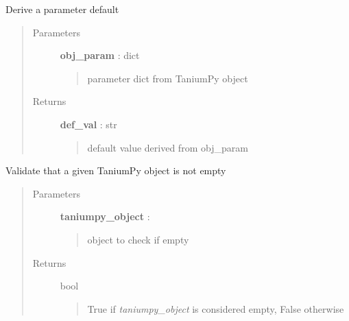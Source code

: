 \documentclass[letterpaper,10pt,english]{sphinxmanual}
\begin{document}
\begin{fulllineitems}
\label{pytan.utils:pytan.utils.derive_param_default}
Derive a parameter default
\begin{quote}\begin{description}
\item[{Parameters}] \leavevmode
\textbf{obj\_param} : dict
\begin{quote}

parameter dict from TaniumPy object
\end{quote}

\item[{Returns}] \leavevmode
\textbf{def\_val} : str
\begin{quote}

default value derived from obj\_param
\end{quote}

\end{description}\end{quote}

\end{fulllineitems}


\begin{fulllineitems}
\label{pytan.utils:pytan.utils.empty_obj}
Validate that a given TaniumPy object is not empty
\begin{quote}\begin{description}
\item[{Parameters}] \leavevmode
\textbf{taniumpy\_object} : {\hyperref[taniumpy.object_types:taniumpy.object_types.base.BaseType]{}}
\begin{quote}

object to check if empty
\end{quote}

\item[{Returns}] \leavevmode
bool
\begin{quote}

True if \emph{taniumpy\_object} is considered empty, False otherwise
\end{quote}

\end{description}\end{quote}

\end{fulllineitems}
\end{document}
